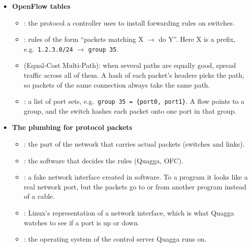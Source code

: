 \begin{itemize}
\begin{itemize}
  \item {} (OpenFlow Controller): the site controller that programs the switches.
  \item {}: the controller platform the OFC is built on.
  \item {} (Network Information Base): Onix's database of the network's state (ports, links and the forwarding rules that should exist). Think of it as the controller's model of the network.
  \item {} (OpenFlow Agent): the small program on each switch that receives rules from the OFC.
  \item {}: the switch's forwarding chip, which actually moves packets at line speed using tables stored in hardware.
  \end{itemize}
\item \textbf{OpenFlow tables}
  \begin{itemize}
  \item {}: the protocol a controller uses to install forwarding rules on switches.
  \item {}: rules of the form ``packets matching X $\to$ do Y''. Here X is a prefix, e.g.\ \texttt{1.2.3.0/24} $\to$ \texttt{group 35}.
  \item {} (Equal-Cost Multi-Path): when several paths are equally good, spread traffic across all of them. A hash of each packet's headers picks the path, so packets of the same connection always take the same path.
  \item {}: a list of port sets, e.g.\ \texttt{group 35 = \{port0, port1\}}. A flow points to a group, and the switch hashes each packet onto one port in that group.
  \end{itemize}
\item \textbf{The plumbing for protocol packets}
  \begin{itemize}
  \item {}: the part of the network that carries actual packets (switches and links).
  \item {}: the software that decides the rules (Quagga, OFC).
  \item {}: a fake network interface created in software. To a program it looks like a real network port, but the packets go to or from another program instead of a cable.
  \item {}: Linux's representation of a network interface, which is what Quagga watches to see if a port is up or down.
  \item {}: the operating system of the control server Quagga runs on.
  \end{itemize}
\end{itemize}

